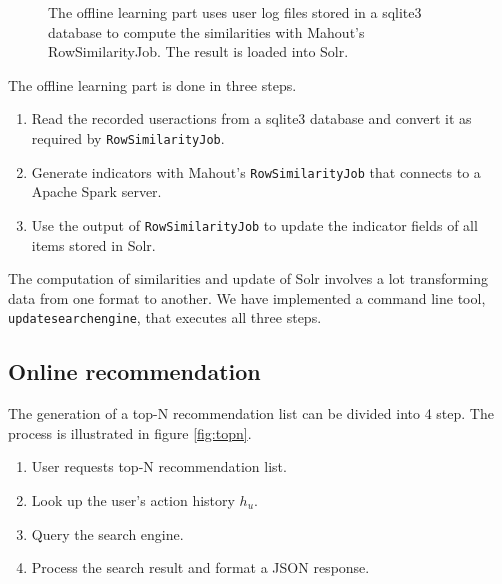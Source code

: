 \begin{figure}
\centering
{}
\caption{The offline learning part uses user log files stored in a sqlite3 database to compute the similarities with Mahout's {\ttfamily RowSimilarityJob}. The result is loaded into Solr.}
\label{fig:offline}
\end{figure}

The offline learning part is done in three steps.

\begin{enumerate}
\item Read the recorded \glspl{useraction} from a sqlite3 database and convert it as required by \verb|RowSimilarityJob|.
\item Generate \glspl{indicator} with Mahout's \verb|RowSimilarityJob| that connects to a Apache Spark server.
\item Use the output of \verb|RowSimilarityJob| to update the indicator fields of all items stored in Solr.
\end{enumerate}

The computation of similarities and update of Solr involves a lot transforming data from one format to another. We have implemented a command line tool, \verb|updatesearchengine|, that executes all three steps. 

\subsection{Online recommendation}
\label{sec:online}

The generation of a top-N recommendation list can be divided into 4 step. The process is illustrated in figure \ref{fig:topn}.

\begin{enumerate}
\item User requests top-N recommendation list.
\item Look up the user's action history $h_u$.
\item Query the search engine.
\item Process the search result and format a JSON response.
\end{enumerate}

